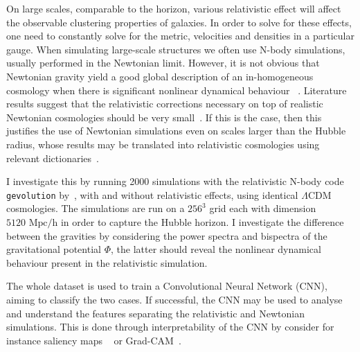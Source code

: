 
On large scales, comparable to the horizon, various relativistic effect will affect the observable clustering properties of galaxies. In order to solve for these effects, one need to constantly solve for the metric, velocities and densities in a particular gauge. When simulating large-scale structures we often use N-body simulations, usually performed in the Newtonian limit. However, it is not obvious that Newtonian gravity yield a good global description of an in-homogeneous cosmology when there is significant nonlinear dynamical behaviour ~\parencite{jeong_large-scale_2012}. Literature results suggest that the relativistic corrections necessary on top of realistic Newtonian cosmologies should be very small~\parencite{chisari_connection_2011}. If this is the case, then this justifies the use of Newtonian simulations even on scales larger than the Hubble radius, whose results may be translated into relativistic cosmologies using relevant dictionaries~\parencite{green_newtonian_2012}.

I investigate this by running 2000 simulations with the relativistic N-body code \texttt{gevolution} by~\cite{adamek_gevolution_2016}, with and without relativistic effects, using identical $\Lambda$CDM cosmologies. The simulations are run on a $256^3$ grid each with dimension $5120\text{ Mpc/h}$ in order to capture the Hubble horizon. I investigate the difference between the gravities by considering the power spectra and bispectra of the gravitational potential $\Phi$, the latter should reveal the nonlinear dynamical behaviour present in the relativistic simulation. 

The whole dataset is used to train a Convolutional Neural Network (CNN), aiming to classify the two cases. If successful, the CNN may be used to analyse and understand the features separating the relativistic and Newtonian simulations. This is done through interpretability of the CNN by consider for instance saliency maps ~\parencite{alqaraawi_evaluating_2020} or Grad-CAM~\parencite{selvaraju_grad-cam_2020}. 
